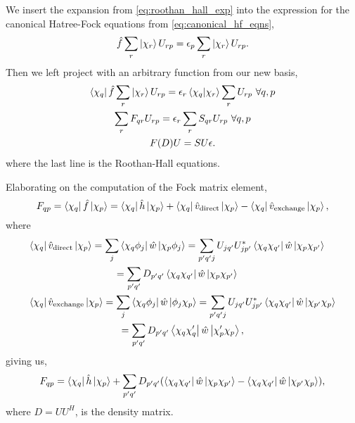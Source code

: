 We insert the expansion from \autoref{eq:roothan_hall_exp} into the expression 
for the canonical Hatree-Fock equations from \autoref{eq:canonical_hf_eqns},
\begin{equation}
    \hat{f}\sum_r \ket{\chi_r} U_{rp} = \epsilon_p \sum_r \ket{\chi_r} U_{rp}.
\end{equation}
Then we left project with an arbitrary function from our new basis,
\begin{equation}
    \begin{gathered}
        \bra{\chi_q} \hat{f} \sum_r \ket{\chi_r} U_{rp}
            = \epsilon_r \braket{\chi_q}{\chi_r} \sum_r U_{rp}\ \forall q,p \\
        \sum_r F_{qr} U_{rp} = \epsilon_r \sum_r S_{qr} U_{rp}\ \forall q,p \\
        F(D) U = S U \epsilon.
    \end{gathered}
\end{equation}
where the last line is the Roothan-Hall equations.

Elaborating on the computation of the Fock matrix element,
\begin{equation}
    F_{qp} = \bra{\chi_q} \hat{f} \ket{\chi_p}
        = \bra{\chi_q} \hat{h} \ket{\chi_p} 
        + \bra{\chi_q} \hat{v}_{\text{direct}} \ket{\chi_p}
        - \bra{\chi_q} \hat{v}_{\text{exchange}} \ket{\chi_p},
\end{equation}
where
\begin{align}
    &\begin{gathered}
    \bra{\chi_q} \hat{v}_{\text{direct}} \ket{\chi_p}
        = \sum_j \bra{\chi_q \phi_j} \hat{w} \ket{\chi_p \phi_j} 
        = \sum_{p'q'j} U_{jq'} U^*_{jp'} 
            \bra{\chi_q \chi_{q'}} \hat{w} \ket{\chi_p \chi_{p'}} \\
        = \sum_{p'q'} D_{p'q'} \bra{\chi_q \chi_{q'}} \hat{w} \ket{\chi_p \chi_{p'}}
    \end{gathered} \\
    &\begin{gathered}
    \bra{\chi_q} \hat{v}_{\text{exchange}} \ket{\chi_p}
        = \sum_j \bra{\chi_q \phi_j} \hat{w} \ket{\phi_j \chi_p} 
        = \sum_{p'q'j} U_{jq'} U^*_{jp'} 
            \bra{\chi_q \chi_{q'}} \hat{w} \ket{\chi_{p'} \chi_p} \\
        = \sum_{p'q'} D_{p'q'} \bra{\chi_q \chi_q'} \hat{w} \ket{\chi_p' \chi_p},  
    \end{gathered}
\end{align}
giving us,
\begin{equation}
    F_{qp} = \bra{\chi_q}\hat{h} \ket{\chi_p} 
        + \sum_{p'q'}D_{p'q'}(
            \bra{\chi_q\chi_{q'}}\hat{w} \ket{\chi_p\chi_{p'}}
            - \bra{\chi_q\chi_{q'}}\hat{w} \ket{\chi_{p'}\chi_p}
        ),
\end{equation}
where $D = UU^H$, is the density matrix.


